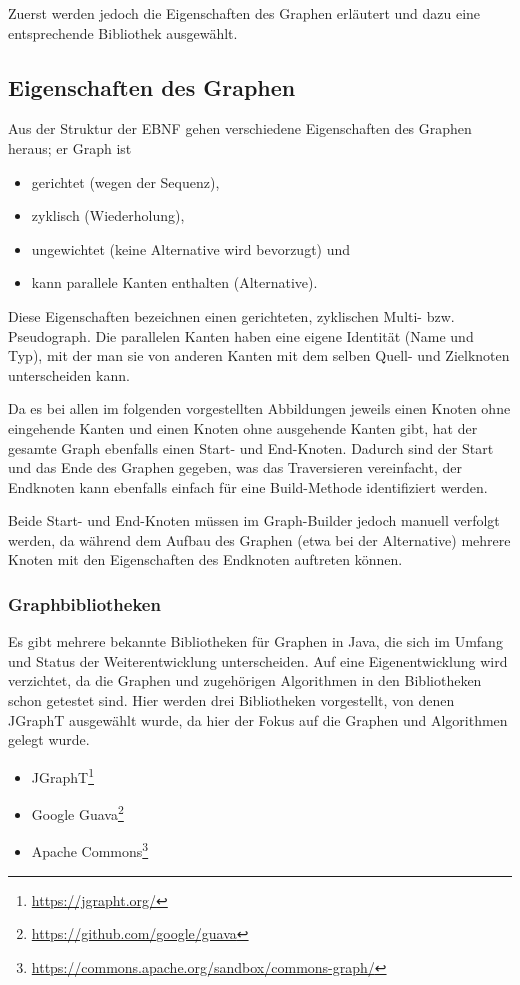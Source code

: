\documentclass[../InterneDSLs.tex]{subfiles}
\begin{document}
Zuerst werden jedoch die Eigenschaften des Graphen erläutert und dazu eine entsprechende Bibliothek ausgewählt.

\subsection{Eigenschaften des Graphen}
Aus der Struktur der EBNF gehen verschiedene Eigenschaften des Graphen heraus; er Graph ist
\begin{itemize}
	\item gerichtet (wegen der Sequenz),
	\item zyklisch (Wiederholung),
	\item ungewichtet (keine Alternative wird bevorzugt) und
	\item kann parallele Kanten enthalten (Alternative).
\end{itemize}
Diese Eigenschaften bezeichnen einen gerichteten, zyklischen Multi- bzw. Pseudograph. Die parallelen Kanten haben eine eigene Identität (Name und Typ), mit der man sie von anderen Kanten mit dem selben Quell- und Zielknoten unterscheiden kann.

Da es bei allen im folgenden vorgestellten Abbildungen jeweils einen Knoten ohne eingehende Kanten und einen Knoten ohne ausgehende Kanten gibt, hat der gesamte Graph ebenfalls einen Start- und End-Knoten. Dadurch sind der Start und das Ende des Graphen gegeben, was das Traversieren vereinfacht, der Endknoten kann ebenfalls einfach für eine Build-Methode identifiziert werden.

Beide Start- und End-Knoten müssen im Graph-Builder jedoch manuell verfolgt werden, da während dem Aufbau des Graphen (etwa bei der Alternative) mehrere Knoten mit den Eigenschaften des Endknoten auftreten können.

\subsubsection{Graphbibliotheken}
Es gibt mehrere bekannte Bibliotheken für Graphen in Java, die sich im Umfang und Status der Weiterentwicklung unterscheiden. Auf eine Eigenentwicklung wird verzichtet, da die Graphen und zugehörigen Algorithmen in den Bibliotheken schon getestet sind. Hier werden drei Bibliotheken vorgestellt, von denen JGraphT ausgewählt wurde, da hier der Fokus auf die Graphen und Algorithmen gelegt wurde.
\begin{itemize}
	\item JGraphT\footnote{\url{https://jgrapht.org/}}
	\item Google Guava\footnote{\url{https://github.com/google/guava}}
	\item Apache Commons\footnote{\url{https://commons.apache.org/sandbox/commons-graph/}}
\end{itemize}
\end{document}
